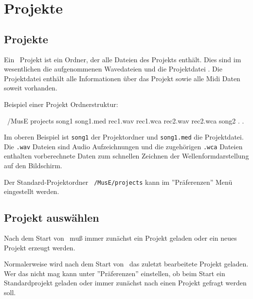 \chapter{Projekte}

  \section{Projekte}

      Ein \M\ Projekt  ist ein Ordner, der alle 
      Dateien des Projekts enthält. Dies sind im wesentlichen die 
      aufgenommenen Wavedateien und die Projektdatei .
      Die Projektdatei enthält alle
      Informationen über das Projekt sowie alle Midi Daten soweit
      vorhanden.

      Beispiel einer Projekt Ordnerstruktur:

      \starttyping
      ~/MusE
            projects
                  song1             
                        song1.med
                        rec1.wav
                        rec1.wca
                        rec2.wav
                        rec2.wca
                  song2
                          .             
                          .             
      \stoptyping

      Im oberen Beispiel ist {\tt song1} der Projektordner
       und
      {\tt song1.med} die Projektdatei. Die {\tt *.wav} Dateien sind
      Audio Aufzeichnungen und die zugehörigen {\tt *.wca} Dateien 
      enthalten vorberechnete Daten zum schnellen Zeichnen der 
      Wellenformdarstellung auf den Bildschirm.

      Der Standard-Projektordner 
      {\tt ~/MusE/projects} kann im ''Präferenzen'' Menü eingestellt 
      werden.

   \section{Projekt auswählen}

      Nach dem Start von \M\ muß immer zunächst ein Projekt geladen oder
      ein neues Projekt erzeugt werden.


      Normalerweise wird nach dem Start von \M\ das zuletzt bearbeitete
      Projekt geladen. Wer das nicht mag kann unter ''Präferenzen'' 
      einstellen, ob beim Start ein Standardprojekt 
      geladen oder immer zunächst nach einen Projekt gefragt werden soll.

